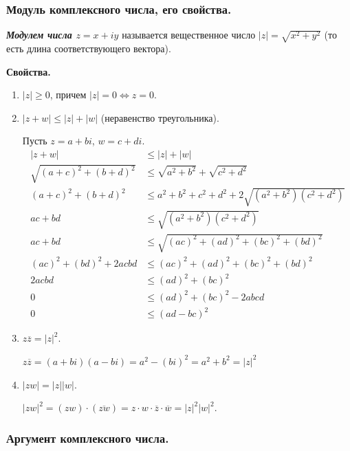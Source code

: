 \subsubsection{
    Модуль комплексного числа, его свойства.
}

\begin{definition}
    \textbf{\textit{Модулем числа $z = x + iy$}} называется вещественное число $|z| = \sqrt{x^2 + y^2}$ (то есть длина соответствующего вектора).
\end{definition}

\textbf{Свойства.}

\begin{enumerate}[label={\arabic*°.}]
    \item $|z| \geq 0$, причем $|z| = 0 \iff z = 0$.
    \item $|z + w| \leq |z| + |w|$ (неравенство треугольника).

    Пусть $z = a + bi$, $w = c + di$.
    \begin{align*}
        |z + w| &\leq |z| + |w| \\
        \sqrt{(a + c)^2 + (b + d)^2} &\leq \sqrt{a^2 + b^2} + \sqrt{c^2 + d^2} \\
        (a + c)^2 + (b + d)^2 &\leq a^2 + b^2 + c^2 + d^2 + 2\sqrt{(a^2 + b^2)(c^2 + d^2)} \\
        ac + bd &\leq\sqrt{(a^2 + b^2)(c^2 + d^2)} \\
        ac + bd &\leq\sqrt{(ac)^2 + (ad)^2 + (bc)^2 + (bd)^2} \\
        (ac)^2 + (bd)^2 + 2acbd &\leq (ac)^2 + (ad)^2 + (bc)^2 + (bd)^2 \\
        2acbd &\leq (ad)^2 + (bc)^2 \\
        0 &\leq (ad)^2 + (bc)^2 - 2abcd \\
        0 &\leq (ad - bc)^2
    \end{align*}
    \item $z \overline{z} = |z|^2$.

    $z \overline{z} = (a + bi)(a - bi) = a^2 - (bi)^2 = a^2 + b^2 = |z|^2$
    \item $|zw| = |z||w|$.

    $|zw|^2 = (zw) \cdot (\overline{zw}) = z \cdot w \cdot \overline{z} \cdot \overline{w} = |z|^2 |w|^2$.
\end{enumerate}


\newpage


\subsubsection{
    Аргумент комплексного числа.
}

